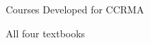 \begin{slide}[\slideopts,toc={Courses}]{Courses Developed for CCRMA}

\maybepause

\centerline{All four textbooks }

\end{slide}

